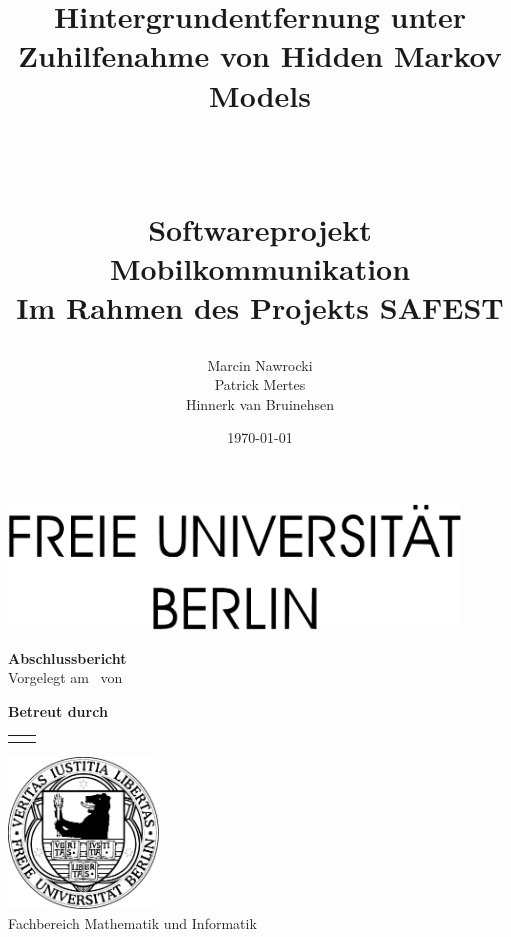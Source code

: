\documentclass[10pt]{report}
\title{
	\begin{huge}Hintergrundentfernung unter Zuhilfenahme von Hidden Markov Models\end{huge}\\
		\vspace{1cm}
\begin{large}Softwareprojekt Mobilkommunikation\\Im Rahmen des Projekts SAFEST\end{large}}
\author{Marcin Nawrocki\\Patrick Mertes\\Hinnerk van Bruinehsen}
\date{\today}
\makeatletter
\newcommand{\advisor}{Prof.\@ Dr.\@ Katinka Wolter}
\newcommand{\coadvisor}{Dipl.-Inform.\@ Alexandra Danilkina}
\newcommand{\thesistype}{Abschlussbericht}
\makeatother
\begin{document}
\onehalfspacing



\begin{titlepage}
  \sffamily
  \large
  \begin{center}
    \includegraphics[width=12cm]{fu-inf-upper}
    \vfill
    \begin{huge}
      \makeatletter\@title\makeatother
    \end{huge}
    \vspace{2cm}
    
    \textbf{\thesistype}\\
    Vorgelegt am \makeatletter\@date\makeatother\ von\\[2ex]
    {\bf\makeatletter\@author\makeatother}
    \vfill

        \bf {Betreut durch} \\
      \begin{tabular}{r|l}
        \llap{\advisor} & \rlap{\coadvisor}
      \end{tabular}
    \vfill

    \includegraphics[width=4cm]{fu-inf-logo}\\[5mm]
    \textsf{\huge Fachbereich Mathematik und Informatik}
  \end{center}
  \restoregeometry
\end{titlepage}


\tableofcontents











\nocite{lamarre2002tracking}

\printbibliography
\end{document}
